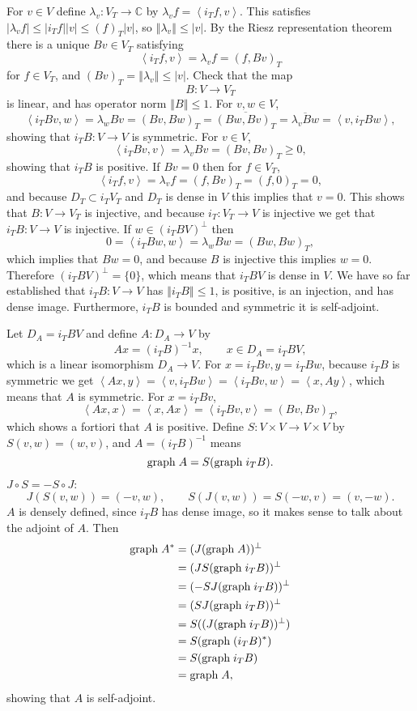 \documentclass{article}
\newcommand{\inner}[2]{\left\langle #1, #2 \right\rangle}
\newcommand{\graph}{\ensuremath\mathrm{graph}\;}
\newcommand{\norm}[1]{\left\Vert #1 \right\Vert}
\theoremstyle{definition}
\begin{document}
For $v \in V$ define $\lambda_v:V_T \to \mathbb{C}$ by
$\lambda_v f = \inner{i_T f}{v}$. This satisfies $|\lambda_v f| \leq |i_T f| |v| \leq (f)_T |v|$, so
$\norm{\lambda_v} \leq |v|$. By the Riesz representation theorem there is a unique 
$Bv \in V_T$ satisfying
\[
\inner{i_T f}{v} = \lambda_v f = (f,Bv)_T
\]
 for $f \in V_T$, and $(Bv)_T = \norm{\lambda_v} \leq 
|v|$.
Check that the map
\[
B:V \to V_T
\]
 is linear, and  has operator norm $\norm{B} \leq 1$. 
For $v,w \in V$,
\[
\inner{i_T Bv}{w} = \lambda_w Bv = (Bv,Bw)_T = \overline{(Bw,Bv)_T}
=\overline{\lambda_v Bw}
=\inner{v}{i_T Bw},
\]
showing that $i_T B:V \to V$ is symmetric. For $v \in V$,
\[
\inner{i_T Bv}{v}
=\lambda_v Bv = (Bv,Bv)_T \geq 0,
\]
showing that $i_T B$ is positive. If $Bv=0$ then 
for $f \in V_T$,
\[
\inner{i_T f}{v} = \lambda_v f = (f,Bv)_T = (f,0)_T = 0,
\]
and because $D_T \subset i_T V_T$ and $D_T$ is dense in $V$ this implies that
$v=0$. This shows that $B:V \to V_T$ is injective, and because $i_T:V_T \to V$ is injective we get
that $i_T B:V \to V$ is  injective. 
If $w \in (i_T B V)^\perp$ then
\[
0=\inner{i_T B w}{w} = \lambda_w Bw = (Bw,Bw)_T,
\]
which implies that $Bw=0$, and because $B$ is injective this implies $w=0$. 
Therefore $(i_T BV)^\perp= \{0\}$, which means that $i_T BV$ is dense in $V$.
We have so far established that $i_T B:V \to V$ has $\norm{i_T B} \leq 1$,
is positive, is an injection, and has dense image. Furthermore, $i_T B$ is bounded and symmetric it is self-adjoint.


Let $D_A = i_TBV$ and  define $A:D_A \to V$ by
\[
Ax=(i_TB)^{-1}x,\qquad x\in D_A = i_TBV,
\]
 which is a linear isomorphism
$D_A \to V$.
 For $x=i_TBv, y = i_TBw$,  because $i_TB$ is symmetric we get
$\inner{Ax}{y}=\inner{v}{i_T Bw}=\inner{i_T Bv}{w} = \inner{x}{Ay}$, which means that $A$ is symmetric.
For $x = i_TBv$, 
\[
\inner{Ax}{x} =\inner{x}{Ax} = \inner{i_TBv}{v} =(Bv,Bv)_T,
\]
which shows a fortiori that $A$ is positive. 
Define $S:V \times V \to V \times V$ by $S(v,w)=(w,v)$, and $A=(i_T B)^{-1}$ means
\[
\graph A = S(\graph i_T B).
\]
$J \circ S = -S \circ J$:
\[
J(S(v,w)) = (-v,w),\qquad S(J(v,w)) = S(-w,v) = (v,-w).
\]
$A$ is densely defined, since $i_TB$ has dense image, so it makes sense to talk about the adjoint of
$A$.
Then
\begin{align*}
\graph A^* &= (J (\graph A))^\perp\\
&= (J S (\graph i_T B))^\perp\\
&= (-SJ (\graph i_T B))^\perp\\
&=  (SJ (\graph i_T B))^\perp\\
&= S((J (\graph i_T B))^\perp)\\
&= S(\graph (i_TB)^*)\\
&= S(\graph i_TB)\\
&= \graph A,
\end{align*}
showing that $A$ is self-adjoint. 
\end{document}
